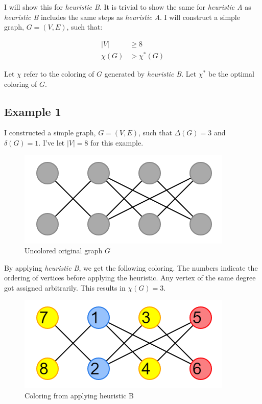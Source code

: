 \documentclass{article}
\begin{document}
I will show this for \emph{heuristic B}. It is trivial to show the same for \emph{heuristic A} as \emph{heuristic B} includes the same steps as \emph{heuristic A}. I will construct a simple graph, \(G = (V, E)\), such that:

\begin{align}
|V| &\geq 8 \\
\chi(G) &> \chi^{*}(G)
\end{align}

Let \(\chi\) refer to the coloring of \(G\) generated by \emph{heuristic B}. Let \(\chi^{*}\) be the optimal coloring of \(G\).

\subsection*{Example 1}
I constructed a simple graph, \(G = (V, E)\), such that \(\Delta(G) = 3\) and \(\delta(G) = 1\). I've let \(|V| = 8\) for this example.

\begin{figure}[H]
\centering
\includegraphics[scale=0.6]{images/graph-1.png}
\caption{Uncolored original graph \(G\)}
\end{figure}

By applying \emph{heuristic B}, we get the following coloring. The numbers indicate the ordering of vertices before applying the heuristic. Any vertex of the same degree got assigned arbitrarily. This results in \(\chi(G) = 3\).

\begin{figure}[H]
\centering
\includegraphics[scale=0.6]{images/graph-2.png}
\caption{Coloring from applying heuristic B}
\end{figure}
\end{document}
